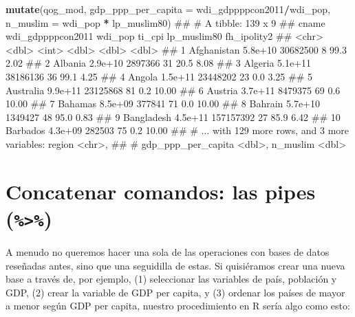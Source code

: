 \documentclass[]{book}
\newenvironment{Shaded}{\begin{snugshade}}{\end{snugshade}}
\newcommand{\KeywordTok}[1]{\textcolor[rgb]{0.13,0.29,0.53}{\textbf{#1}}}
\newcommand{\DataTypeTok}[1]{\textcolor[rgb]{0.13,0.29,0.53}{#1}}
\newcommand{\StringTok}[1]{\textcolor[rgb]{0.31,0.60,0.02}{#1}}
\newcommand{\OperatorTok}[1]{\textcolor[rgb]{0.81,0.36,0.00}{\textbf{#1}}}
\newcommand{\NormalTok}[1]{#1}
\begin{document}
\begin{Shaded}
\begin{Highlighting}[]
\KeywordTok{mutate}\NormalTok{(qog_mod, }
       \DataTypeTok{gdp_ppp_per_capita =}\NormalTok{ wdi_gdppppcon2011}\OperatorTok{/}\NormalTok{wdi_pop,}
       \DataTypeTok{n_muslim           =}\NormalTok{ wdi_pop }\OperatorTok{*}\StringTok{ }\NormalTok{lp_muslim80)}
\NormalTok{## # A tibble: 139 x 9}
\NormalTok{##          cname wdi_gdppppcon2011   wdi_pop ti_cpi lp_muslim80 fh_ipolity2}
\NormalTok{##          <chr>             <dbl>     <int>  <dbl>       <dbl>       <dbl>}
\NormalTok{##  1 Afghanistan           5.8e+10  30682500      8        99.3        2.02}
\NormalTok{##  2     Albania           2.9e+10   2897366     31        20.5        8.08}
\NormalTok{##  3     Algeria           5.1e+11  38186136     36        99.1        4.25}
\NormalTok{##  4      Angola           1.5e+11  23448202     23         0.0        3.25}
\NormalTok{##  5   Australia           9.9e+11  23125868     81         0.2       10.00}
\NormalTok{##  6     Austria           3.7e+11   8479375     69         0.6       10.00}
\NormalTok{##  7     Bahamas           8.5e+09    377841     71         0.0       10.00}
\NormalTok{##  8     Bahrain           5.7e+10   1349427     48        95.0        0.83}
\NormalTok{##  9  Bangladesh           4.5e+11 157157392     27        85.9        6.42}
\NormalTok{## 10    Barbados           4.3e+09    282503     75         0.2       10.00}
\NormalTok{## # ... with 129 more rows, and 3 more variables: region <chr>,}
\NormalTok{## #   gdp_ppp_per_capita <dbl>, n_muslim <dbl>}
\end{Highlighting}
\end{Shaded}

\section{\texorpdfstring{Concatenar comandos: las pipes
(\texttt{\%\textgreater{}\%})}{Concatenar comandos: las pipes (\%\textgreater{}\%)}}\label{concatenar-comandos-las-pipes}

A menudo no queremos hacer una sola de las operaciones con bases de
datos reseñadas antes, sino que una seguidilla de estas. Si quisiéramos
crear una nueva base a través de, por ejemplo, (1) seleccionar las
variables de país, población y GDP, (2) crear la variable de GDP per
capita, y (3) ordenar los países de mayor a menor según GDP per capita,
nuestro procedimiento en R sería algo como esto:
\end{document}
